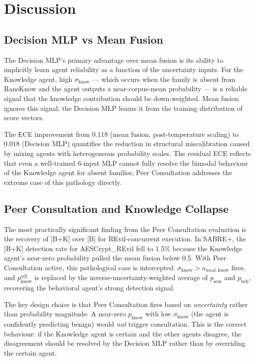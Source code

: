 \documentclass[journal]{IEEEtran}
\newcommand{\sem}{\mathrm{sem}}
\newcommand{\beh}{\mathrm{beh}}
\newcommand{\know}{\mathrm{know}}
\begin{document}
\section{Discussion}
\label{sec:discussion}

\subsection{Decision MLP vs Mean Fusion}

The Decision MLP's primary advantage over mean fusion is its ability
to implicitly learn agent reliability as a function of the uncertainty
inputs.
For the Knowledge agent, high $\sigma_{\know}$ --- which occurs when the
family is absent from RansKnow and the agent outputs a near-corpus-mean
probability --- is a reliable signal that the knowledge contribution
should be down-weighted.
Mean fusion ignores this signal; the Decision MLP learns it from the
training distribution of score vectors.

The ECE improvement from $0.118$ (mean fusion, post-temperature scaling)
to $\mathbf{0.018}$ (Decision MLP) quantifies the reduction in
structural miscalibration caused by mixing agents with heterogeneous
probability scales.
The residual ECE reflects that even a well-trained 6-input MLP cannot
fully resolve the bimodal behaviour of the Knowledge agent for absent
families; Peer Consultation addresses the extreme case of this pathology
directly.

\subsection{Peer Consultation and Knowledge Collapse}

The most practically significant finding from the Peer Consultation
evaluation is the recovery of [B+K] over [B] for REvil-concurrent
execution.
In SABRE+, the [B+K] detection rate for AESCrypt\_REvil fell to 1.5\%
because the Knowledge agent's near-zero probability pulled the mean
fusion below 0.5.
With Peer Consultation active, this pathological case is intercepted:
$\sigma_{\know} > \kappa_{\mathrm{local},\know}$ fires, and
$p_{\know}^{\mathrm{adj}}$ is replaced by the inverse-uncertainty-weighted
average of $p_{\sem}$ and $p_{\beh}$, recovering the behavioral agent's
strong detection signal.

The key design choice is that Peer Consultation fires based on
\emph{uncertainty} rather than probability magnitude.
A near-zero $p_{\know}$ with low $\sigma_{\know}$ (the agent is
confidently predicting benign) would \emph{not} trigger consultation.
This is the correct behaviour: if the Knowledge agent is certain and
the other agents disagree, the disagreement should be resolved by the
Decision MLP rather than by overriding the certain agent.
\end{document}
